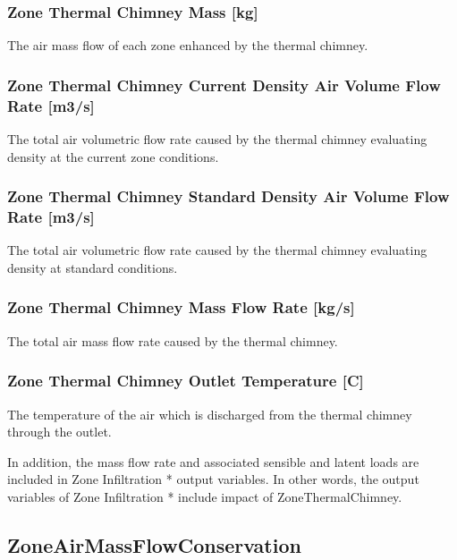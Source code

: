 \subsubsection{Zone Thermal Chimney Mass {[}kg{]}}\label{zone-thermal-chimney-mass-kg}

The air mass flow of each zone enhanced by the thermal chimney.

\subsubsection{Zone Thermal Chimney Current Density Air Volume Flow Rate {[}m3/s{]}}\label{zone-thermal-chimney-current-density-volumetric-flow-rate-m3s}

The total air volumetric flow rate caused by the thermal chimney evaluating density at the current zone conditions.

\subsubsection{Zone Thermal Chimney Standard Density Air Volume Flow Rate {[}m3/s{]}}\label{zone-thermal-chimney-standard-density-volumetric-flow-rate-m3s}

The total air volumetric flow rate caused by the thermal chimney evaluating density at standard conditions.

\subsubsection{Zone Thermal Chimney Mass Flow Rate {[}kg/s{]}}\label{zone-thermal-chimney-mass-flow-rate-kgs}

The total air mass flow rate caused by the thermal chimney.

\subsubsection{Zone Thermal Chimney Outlet Temperature {[}C{]}}\label{zone-thermal-chimney-outlet-temperature-c}

The temperature of the air which is discharged from the thermal chimney through the outlet.

In addition, the mass flow rate and associated sensible and latent loads are included in Zone Infiltration * output variables. In other words, the output variables of Zone Infiltration * include impact of ZoneThermalChimney.

\subsection{ZoneAirMassFlowConservation}\label{zoneairmassflowconservation}


